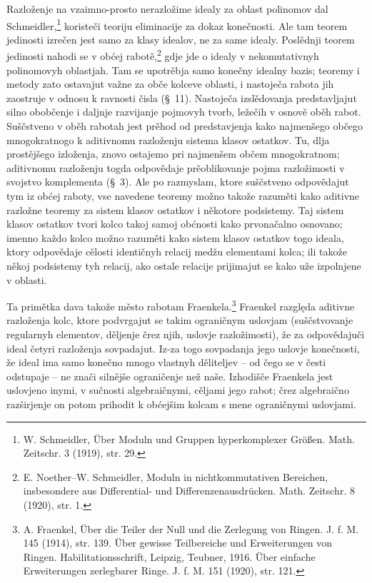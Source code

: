 \documentclass[11pt]{article}
\begin{document}
Razloženje na vzaimno-prosto nerazložime idealy za oblast polinomov dal Schmeidler,\footnote{W. Schmeidler, Über Moduln und Gruppen hyperkomplexer Größen. Math. Zeitschr. 3 (1919), str. 29.} koristeči teoriju eliminacije za dokaz konečnosti. Ale tam teorem jedinosti izrečen jest samo za klasy idealov, ne za same idealy. Poslědnji teorem jedinosti nahodi se v obćej rabotě,\footnote{E. Noether--W. Schmeidler, Moduln in nichtkommutativen Bereichen, insbesondere aus Differential- und Differenzenausdrücken. Math. Zeitschr. 8 (1920), str. 1.} gdje jde o idealy v nekomutativnyh polinomovyh oblastjah. Tam se upotrěbja samo konečny idealny bazis; teoremy i metody zato ostavajut važne za obče kolceve oblasti, i nastoječa rabota jih zaostruje v odnosu k ravnosti čisla (\S~11). Nastoječa izslědovanja predstavljajut silno obobčenje i daljnje razvijanje pojmovyh tvorb, ležečih v osnově oběh rabot. Suščstveno v oběh rabotah jest prěhod od predstavjenja kako najmenšego občego mnogokratnogo k aditivnomu razloženju sistema klasov ostatkov. Tu, dlja prostějšego izloženja, znovo ostajemo pri najmenšem občem mnogokratnom; aditivnomu razloženju togda odpovědaje prěoblikovanje pojma razložimosti v svojstvo komplementa (\S~3). Ale po razmyslam, ktore suščstveno odpovědajut tym iz obćej raboty, vse navedene teoremy možno takože razuměti kako aditivne razložne teoremy za sistem klasov ostatkov i někotore podsistemy. Taj sistem klasov ostatkov tvori kolco takoj samoj obćnosti kako prvonačalno osnovano; imenno každo kolco možno razuměti kako sistem klasov ostatkov togo ideala, ktory odpovědaje cělosti identičnyh relacij medžu elementami kolca; ili takože někoj podsistemy tyh relacij, ako ostale relacije prijimajut se kako uže izpolnjene v oblasti.

Ta primětka dava takože město rabotam Fraenkela.\footnote{A. Fraenkel, Über die Teiler der Null und die Zerlegung von Ringen. J. f. M. 145 (1914), str. 139. Über gewisse Teilbereiche und Erweiterungen von Ringen. Habilitationsschrift, Leipzig, Teubner, 1916. Über einfache Erweiterungen zerlegbarer Ringe. J. f. M. 151 (1920), str. 121.} Fraenkel razględa aditivne razloženja kolc, ktore podvrgajut se takim ograničnym uslovjam (suščstvovanje regularnyh elementov, děljenje črez njih, uslovje razložimosti), že za odpovědajuči ideal četyri razloženja sovpadajut. Iz-za togo sovpadanja jego uslovje konečnosti, že ideal ima samo konečno mnogo vlastnyh děliteljev -- od čego se v česti odstupaje -- ne znači silnějše ograničenje než naše. Izhodišče Fraenkela jest uslovjeno inymi, v sučnosti algebraičnymi, cěljami jego rabot; črez algebraično razširjenje on potom prihodit k obćejšim kolcam s mene ograničnymi uslovjami.

\clearpage
\end{document}
